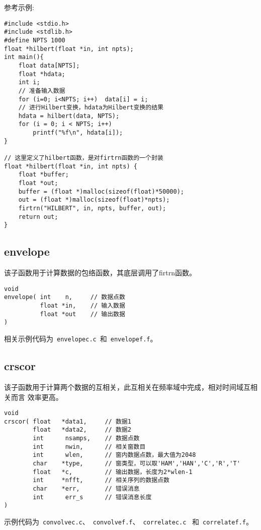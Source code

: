 参考示例:
\begin{verbatim}
#include <stdio.h>
#include <stdlib.h>
#define NPTS 1000
float *hilbert(float *in, int npts);
int main(){
    float data[NPTS];
    float *hdata;
    int i;
    // 准备输入数据
    for (i=0; i<NPTS; i++)  data[i] = i;
    // 进行Hilbert变换，hdata为Hilbert变换的结果
    hdata = hilbert(data, NPTS);
    for (i = 0; i < NPTS; i++)
        printf("%f\n", hdata[i]);
}

// 这里定义了hilbert函数，是对firtrn函数的一个封装
float *hilbert(float *in, int npts) {
    float *buffer;
    float *out;
    buffer = (float *)malloc(sizeof(float)*50000);
    out = (float *)malloc(sizeof(float)*npts);
    firtrn("HILBERT", in, npts, buffer, out);
    return out;
}
\end{verbatim}

\subsection{envelope}
该子函数用于计算数据的包络函数，其底层调用了firtrn函数。
\begin{verbatim}
void
envelope( int    n,     // 数据点数
          float *in,    // 输入数据
          float *out    // 输出数据
)
\end{verbatim}

相关示例代码为~\verb+envelopec.c+~和~\verb+envelopef.f+。

\subsection{crscor}
该子函数用于计算两个数据的互相关，此互相关在频率域中完成，相对时间域互相关而言
效率更高。

\begin{verbatim}
void
crscor( float   *data1,     // 数据1
        float   *data2,     // 数据2
        int      nsamps,    // 数据点数
        int      nwin,      // 相关窗数目
        int      wlen,      // 窗内数据点数，最大值为2048
        char    *type,      // 窗类型，可以取'HAM','HAN','C','R','T'
        float   *c,         // 输出数据，长度为2*wlen-1
        int     *nfft,      // 相关序列的数据点数
        char    *err,       // 错误消息
        int      err_s      // 错误消息长度
)
\end{verbatim}

示例代码为~\verb+convolvec.c+、~\verb+convolvef.f+、~\verb+correlatec.c+~
和~\verb+correlatef.f+。